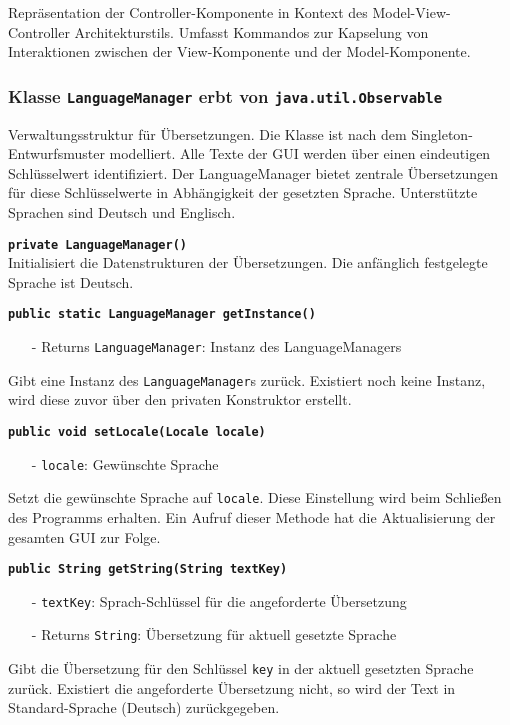 \documentclass[parskip=full,11pt,twoside]{scrartcl}
\begin{document}
Repräsentation der Controller-Komponente in Kontext des Model-View-Controller Architekturstils. Umfasst Kommandos zur Kapselung von Interaktionen zwischen der View-Komponente und der Model-Komponente.

\subsubsection{Klasse \texttt{LanguageManager} erbt von \texttt{java.util.Observable}}

Verwaltungsstruktur für Übersetzungen. Die Klasse ist nach dem Singleton-Entwurfsmuster modelliert. Alle Texte der GUI werden über einen eindeutigen Schlüsselwert identifiziert. Der LanguageManager bietet zentrale Übersetzungen für diese Schlüsselwerte in Abhängigkeit der gesetzten Sprache. Unterstützte Sprachen sind Deutsch und Englisch.

\textbf{\texttt{private LanguageManager()}}\\
Initialisiert die Datenstrukturen der Übersetzungen. Die anfänglich festgelegte Sprache ist Deutsch.

\textbf{\texttt{public static LanguageManager getInstance()}}
\begin{itemize}[noitemsep]
	\item[-] Returns \texttt{LanguageManager}: Instanz des LanguageManagers
\end{itemize}
Gibt eine Instanz des \texttt{LanguageManager}s zurück. Existiert noch keine Instanz, wird diese zuvor über den privaten Konstruktor erstellt.

\textbf{\texttt{public void setLocale(Locale locale)}}
\begin{itemize}[noitemsep]
	\item[-] \texttt{locale}: Gewünschte Sprache
\end{itemize}
Setzt die gewünschte Sprache auf \texttt{locale}. Diese Einstellung wird beim Schließen des Programms erhalten. Ein Aufruf dieser Methode hat die Aktualisierung der gesamten GUI zur Folge.

\textbf{\texttt{public String getString(String textKey)}}
\begin{itemize}[noitemsep]
	\item[-] \texttt{textKey}: Sprach-Schlüssel für die angeforderte Übersetzung
	\item[-] Returns \texttt{String}: Übersetzung für aktuell gesetzte Sprache
\end{itemize}
Gibt die Übersetzung für den Schlüssel \texttt{key} in der aktuell gesetzten Sprache zurück. Existiert die angeforderte Übersetzung nicht, so wird der Text in Standard-Sprache (Deutsch) zurückgegeben.
\end{document}
